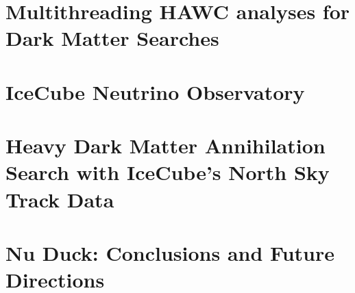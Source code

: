 \documentclass[PhD]{msu-thesis}
\begin{document}
\chapter{Multithreading HAWC analyses for Dark Matter Searches} \label{sec:multithread}


\chapter{IceCube Neutrino Observatory\label{sec:ice3}}


\chapter{Heavy Dark Matter Annihilation Search with IceCube's North Sky Track Data} \label{sec:ic3_dm}


\chapter{Nu Duck: Conclusions and Future Directions\label{sec:nu_duck}}

\end{document}
